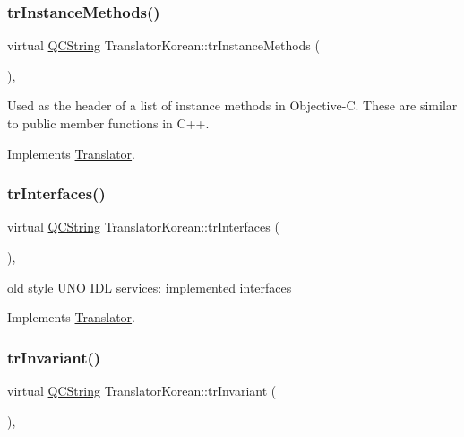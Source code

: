 \subsubsection{\texorpdfstring{trInstanceMethods()}{trInstanceMethods()}}
{\footnotesize\ttfamily virtual \mbox{\hyperlink{class_q_c_string}{Q\+C\+String}} Translator\+Korean\+::tr\+Instance\+Methods (\begin{DoxyParamCaption}{ }\end{DoxyParamCaption})\hspace{0.3cm}{\ttfamily [inline]}, {\ttfamily [virtual]}}

Used as the header of a list of instance methods in Objective-\/C. These are similar to public member functions in C++. 

Implements \mbox{\hyperlink{class_translator}{Translator}}.

\mbox{\label{class_translator_korean_a04a9331e7df2bcbcda7292d653955653}} 
\subsubsection{\texorpdfstring{trInterfaces()}{trInterfaces()}}
{\footnotesize\ttfamily virtual \mbox{\hyperlink{class_q_c_string}{Q\+C\+String}} Translator\+Korean\+::tr\+Interfaces (\begin{DoxyParamCaption}{ }\end{DoxyParamCaption})\hspace{0.3cm}{\ttfamily [inline]}, {\ttfamily [virtual]}}

old style U\+NO I\+DL services\+: implemented interfaces 

Implements \mbox{\hyperlink{class_translator}{Translator}}.

\mbox{\label{class_translator_korean_a74db9cdb8dc967ee1877ca22cea1bf34}} 
\subsubsection{\texorpdfstring{trInvariant()}{trInvariant()}}
{\footnotesize\ttfamily virtual \mbox{\hyperlink{class_q_c_string}{Q\+C\+String}} Translator\+Korean\+::tr\+Invariant (\begin{DoxyParamCaption}{ }\end{DoxyParamCaption})\hspace{0.3cm}{\ttfamily [inline]}, {\ttfamily [virtual]}}

